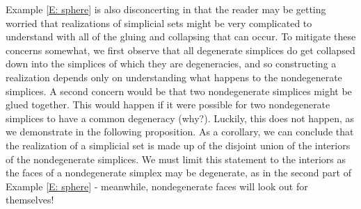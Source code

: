 \documentclass[12pt]{article}
\theoremstyle{plain}
\theoremstyle{definition}
\begin{document}
Example \ref{E: sphere} is also disconcerting in that the reader may be getting worried that realizations of simplicial sets might be very complicated to understand with all of the gluing and collapsing that can occur. To mitigate these concerns somewhat, we first observe that all degenerate simplices do get collapsed down into the simplices of which they are degeneracies, and so constructing a realization depends only on understanding what happens to the nondegenerate simplices. A second concern would be that two nondegenerate simplices might be glued together. This would happen if it were possible for two nondegenerate simplices to have a common degeneracy (why?). Luckily, this does not happen, as we demonstrate in the following proposition. As a corollary, we can conclude that the realization of a simplicial set is made up of the disjoint union of the interiors of the nondegenerate simplices. We must limit this statement to the interiors as the faces of a nondegenerate simplex may be degenerate, as in the second part of Example \ref{E: sphere} - meanwhile, nondegenerate faces will look out for themselves!
\end{document}
